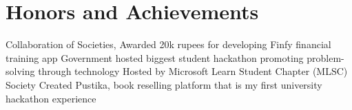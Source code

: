 \section{Honors and Achievements}
  \resumeSubHeadingListStart
      {Collaboration of Societies, Awarded 20k rupees for developing Finfy financial training app}
      {Government hosted biggest student hackathon promoting problem-solving through technology}
      {Hosted by Microsoft Learn Student Chapter (MLSC) Society}
      {Created Pustika, book reselling platform that is my first university hackathon experience}
  \resumeSubHeadingListEnd